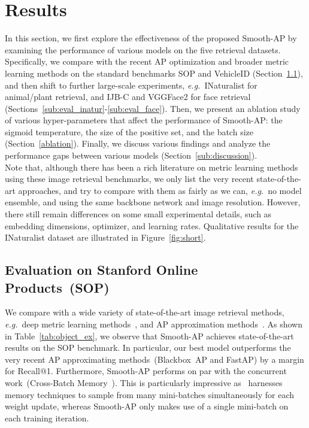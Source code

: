\documentclass[runningheads]{llncs}
\providecommand{\eg}[0]{\emph{e.g.}}
\begin{document}
 \label{sec:experimental_setup}




\section{Results}
In this section, 
we first explore the effectiveness of the proposed Smooth-AP by examining the performance of various models on the five retrieval datasets.
Specifically, 
we compare with the recent AP optimization and broader metric learning methods on the standard benchmarks
SOP and VehicleID (Section~\ref{sub:eval_sopcub}), 
and then shift to further large-scale experiments, 
\eg~INaturalist for animal/plant retrieval, 
and IJB-C and VGGFace2 for face retrieval (Sections~\ref{sub:eval_inatur}-\ref{sub:eval_face}). 
Then, we present an ablation study of various
hyper-parameters that affect the performance 
of Smooth-AP: 
the sigmoid temperature, the size of the positive set, and the batch size
(Section~\ref{ablation}).
Finally, we discuss various findings and analyze the performance gaps between various models (Section~\ref{sub:discussion}). \\

Note that, although there has been a rich literature on metric learning methods \cite{Duan18deep,Ge18,Harwood17smart,Kim18,Law17,Lu19,Movshovitz17,oh2017deep,Opitz17,qian2019softtriple,Rolnek20optimizing,Song16,suh2019stochastic,Ustinova16,Wang17metric,Wang19ranked,wang2019multi,wang2020cross,Wu17,Xuan18deep,Yuan17hard} using these image retrieval benchmarks,
we only list the very recent state-of-the-art approaches, 
and try to compare with them as fairly as we can, \eg\ no model ensemble, and using the same backbone network and image resolution. 
However, there still remain differences on some small experimental details, 
such as embedding dimensions, optimizer, and learning rates.
Qualitative results for the INaturalist dataset are illustrated in Figure~\ref{fig:short}.



\subsection{Evaluation on Stanford Online Products~(SOP)}
\label{sub:eval_sopcub}
We compare with a wide variety of state-of-the-art image retrieval methods, 
\eg~deep metric learning methods~\cite{roth2019mic,sanakoyeu2019divide,wang2020cross,Wu17}, 
and AP approximation methods~\cite{Cakir19,Rolnek20optimizing}.
As shown in Table~\ref{tab:object_ex}, 
we observe that Smooth-AP achieves state-of-the-art results on the SOP benchmark. 
In particular, our best model outperforms the very recent AP approximating methods~(Blackbox~AP and FastAP) by a  margin for Recall@1. 
Furthermore, Smooth-AP performs on par with the concurrent work~(Cross-Batch Memory~\cite{wang2020cross}).
This is particularly impressive as~\cite{wang2020cross} harnesses memory techniques to sample from many mini-batches simultaneously for each weight update, 
whereas Smooth-AP only makes use of a single mini-batch on each training iteration. \\
\end{document}
